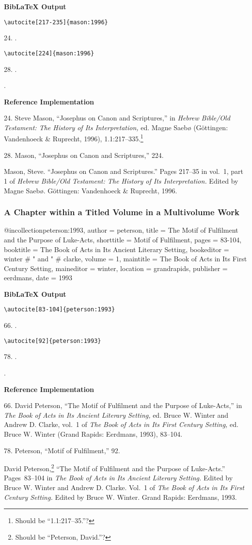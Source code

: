 \documentclass[a4paper]{article}
\newcommand\citetest[5]{%
  {\textbf{BibLaTeX Output}\par
   \nobreak
   \texttt{\textbackslash autocite[#2]\{#5\}}\par
   \color{biblatex-colour}
   #1. \cite[#2]{#5}.\par
   \color{black}
   \texttt{\textbackslash autocite[#4]\{#5\}}\par
   \color{biblatex-colour}
   #3. \cite[#4]{#5}.\par
   \hangindent\bibindent\bibentrycite{#5}.\par}}
\newenvironment{refimp}{%
  \begin{minipage}{\linewidth}
    \setlength{\parskip}{1ex}
    \textbf{Reference Implementation}\par
    \nobreak
    \color{reference-colour}
}{\end{minipage}}
\newenvironment{vb}{%
  \setlength{\parskip}{0pt}
  \verbatim}{\endverbatim}
\begin{document}
\citetest{24}{217-235}{28}{224}{mason:1996}

\begin{refimp}
  24. Steve Mason, “Josephus on Canon and Scriptures,” in \emph{Hebrew
  Bible\slash Old Testament: The History of Its Interpretation,} ed. Magne
  Saebø (Göttingen: Vandenhoeck \& Ruprecht, 1996),
  1.1:217–335.\footnote{Should be “1.1:217–35.”?}

  28. Mason, “Josephus on Canon and Scriptures,” 224.

  \hangindent\bibindent Mason, Steve. “Josephus on Canon and Scriptures.”
  Pages 217–35 in vol.~1, part 1 of \emph{Hebrew Bible\slash Old Testament:
  The History of Its Interpretation.} Edited by Magne Saebø. Göttingen:
  Vandenhoeck \& Ruprecht, 1996.
\end{refimp}

\subsubsection{A Chapter within a Titled Volume in a Multivolume Work}

\begin{vb}
@incollection{peterson:1993,
  author = peterson,
  title = {The Motif of Fulfilment and the Purpose of Luke-Acts},
  shorttitle = {Motif of Fulfilment},
  pages = {83-104},
  booktitle = {The Book of Acts in Its Ancient Literary Setting},
  bookeditor = winter # " and " # clarke,
  volume = {1},
  maintitle = {The Book of Acts in Its First Century Setting},
  maineditor = winter,
  location = grandrapids,
  publisher = eerdmans,
  date = {1993}
}
\end{vb}  

\citetest{66}{83-104}{78}{92}{peterson:1993}

\begin{refimp}
  66. David Peterson, “The Motif of Fulfilment and the Purpose of Luke-Acts,”
  in \emph{The Book of Acts in Its Ancient Literary Setting,} ed. Bruce W.
  Winter and Andrew D. Clarke, vol.~1 of \emph{The Book of Acts in Its First
  Century Setting,} ed. Bruce W. Winter (Grand Rapids: Eerdmans, 1993),
  83–104.

  78. Peterson, “Motif of Fulfilment,” 92.

  \hangindent\bibindent David Peterson,\footnote{Should be “Peterson,
  David.”?} “The Motif of Fulfilment and the Purpose of Luke-Acts.”
  Pages~83–104 in \emph{The Book of Acts in Its Ancient Literary Setting.}
  Edited by Bruce W. Winter and Andrew D. Clarke. Vol.~1 of \emph{The Book of
  Acts in Its First Century Setting.} Edited by Bruce W. Winter. Grand Rapids:
  Eerdmans, 1993.
\end{refimp}
\end{document}
